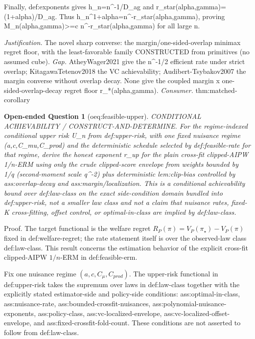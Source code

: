 \documentclass{article}
\newtheorem{openendedquestion}{Open-ended Question}
\begin{document}
Finally, def:exponents gives h_n=n^{-1/D_ag} and r_star(alpha,gamma)=(1+alpha)/D_ag. Thus h_n^{1+alpha}=n^{-r_star(alpha,gamma)}, proving M_n(alpha,gamma)>=c n^{-r_star(alpha,gamma)} for all large n.
\par\smallskip\noindent \textit{Justification.} The novel sharp converse: the margin/one-sided-overlap minimax regret floor, with the least-favorable family CONSTRUCTED from primitives (no assumed cube). \textit{Gap.} AtheyWager2021 give the n^{-1/2} efficient rate under strict overlap; KitagawaTetenov2018 the VC achievability; Audibert-Tsybakov2007 the margin converse without overlap decay. None give the coupled margin x one-sided-overlap-decay regret floor r_*(alpha,gamma). \textit{Consumer.} thm:matched-corollary

\begin{openendedquestion}[oeq:feasible-upper]\label{oeq:feasible-upper}
CONDITIONAL ACHIEVABILITY / CONSTRUCT-AND-DETERMINE. For the regime-indexed conditional upper risk U_n from def:upper-risk, with one fixed nuisance regime (a,c,C_mu,C_prod) and the deterministic schedule selected by def:feasible-rate for that regime, derive the honest exponent r_up for the plain cross-fit clipped-AIPW 1/n-ERM using only the crude clipped-score envelope from weights bounded by 1/q (second-moment scale q^{-2}) plus deterministic lem:clip-bias controlled by ass:overlap-decay and ass:margin/localization. This is a conditional achievability bound over def:law-class on the exact side-condition domain bundled into def:upper-risk, not a smaller law class and not a claim that nuisance rates, fixed-K cross-fitting, offset control, or optimal-in-class are implied by def:law-class.
\end{openendedquestion}
Proof. The target functional is the welfare regret \(R_P(\pi)=V_P(\pi_\star)-V_P(\pi)\) fixed in def:welfare-regret; the rate statement itself is over the observed-law class def:law-class. This result concerns the estimation behavior of the explicit cross-fit clipped-AIPW \(1/n\)-ERM in def:feasible-erm.

Fix one nuisance regime \((a,c,C_\mu,C_{prod})\). The upper-risk functional in def:upper-risk takes the supremum over laws in def:law-class together with the explicitly stated estimator-side and policy-side conditions: ass:optimal-in-class, ass:nuisance-rate, ass:bounded-crossfit-nuisances, ass:polynomial-nuisance-exponents, ass:policy-class, ass:vc-localized-envelope, ass:vc-localized-offset-envelope, and ass:fixed-crossfit-fold-count. These conditions are not asserted to follow from def:law-class.
\end{document}
